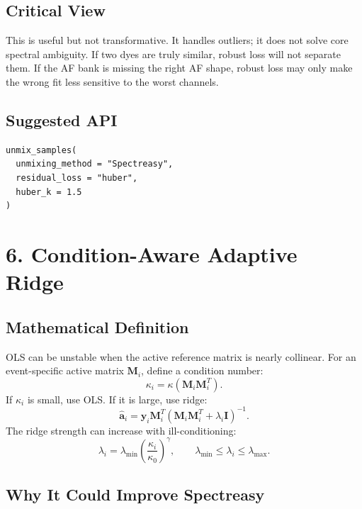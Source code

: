 \documentclass[11pt]{article}
\newcommand{\y}{\mathbf{y}}
\newcommand{\M}{\mathbf{M}}
\newcommand{\aev}{\mathbf{a}}
\newcommand{\I}{\mathbf{I}}
\begin{document}
\subsection*{Critical View}

This is useful but not transformative. It handles outliers; it does not solve
core spectral ambiguity. If two dyes are truly similar, robust loss will not
separate them. If the AF bank is missing the right AF shape, robust loss may only
make the wrong fit less sensitive to the worst channels.

\subsection*{Suggested API}

\begin{verbatim}
unmix_samples(
  unmixing_method = "Spectreasy",
  residual_loss = "huber",
  huber_k = 1.5
)
\end{verbatim}

\section{6. Condition-Aware Adaptive Ridge}

\subsection*{Mathematical Definition}

OLS can be unstable when the active reference matrix is nearly collinear. For an
event-specific active matrix \(\M_i\), define a condition number:
\begin{equation}
  \kappa_i
  =
  \kappa\left(\M_i\M_i^T\right).
\end{equation}
If \(\kappa_i\) is small, use OLS. If it is large, use ridge:
\begin{equation}
  \hat{\aev}_i
  =
  \y_i\M_i^T
  \left(
    \M_i\M_i^T + \lambda_i\I
  \right)^{-1}.
\end{equation}
The ridge strength can increase with ill-conditioning:
\begin{equation}
  \lambda_i
  =
  \lambda_{\min}
  \left(
    \frac{\kappa_i}{\kappa_0}
  \right)^{\gamma},
  \qquad
  \lambda_{\min}
  \leq
  \lambda_i
  \leq
  \lambda_{\max}.
\end{equation}

\subsection*{Why It Could Improve Spectreasy}
\end{document}
